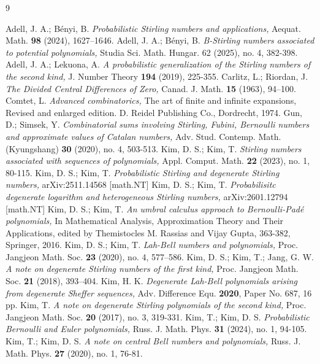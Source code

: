 \documentclass[a4paper,11pt]{amsart}
\begin{document}
\begin{thebibliography}{9} 

Adell, J. A.; B{\'e}nyi, B. \emph{Probabilistic Stirling numbers and applications,} Aequat. Math. \textbf{98} (2024), 1627–1646.
Adell, J. A.; B{\'e}nyi, B. \emph{B-Stirling numbers associated to potential polynomials,} Studia Sci. Math. Hungar. 62 (2025), no. 4, 382-398.
Adell, J. A.; Lekuona, A. \emph{A probabilistic generalization of the Stirling numbers of the second kind,} J. Number Theory \textbf{194} (2019), 225-355.
Carlitz, L.; Riordan, J. \emph{The Divided Central Differences of Zero,} Canad.  J.  Math.  \textbf{15} (1963), 94–100.
Comtet, L. \emph{Advanced combinatorics,} The art of finite and infinite expansions, Revised and enlarged edition. D. Reidel Publishing Co., Dordrecht, 1974.
Gun, D.; Simsek, Y. \emph{Combinatorial sums involving Stirling, Fubini, Bernoulli numbers and approximate values of Catalan numbers,} Adv. Stud. Contemp. Math. (Kyungshang) \textbf{30} (2020), no. 4, 503-513.
Kim, D. S.; Kim, T. \emph{Stirling numbers associated with sequences of polynomials,} Appl. Comput. Math. \textbf{22} (2023), no. 1, 80-115.
Kim, D. S.; Kim, T. \emph{Probabilistic Stirling and degenerate Stirling numbers,} arXiv:2511.14568 [math.NT]
Kim, D. S.; Kim, T. \emph{Probabilisitc degenerate logarithm and heterogeneous Stirling numbers,} arXiv:2601.12794 [math.NT]
Kim, D. S.; Kim, T. \emph{An umbral calculus approach to Bernoulli-Pad\'e polynomials,} In Mathematical Analysis, Approximation Theory and Their Applications, edited by Themistocles M. Rassias and Vijay Gupta, 363-382, Springer, 2016.
Kim, D. S.; Kim, T. \emph{Lah-Bell numbers and polynomials,} Proc.  Jangjeon Math.  Soc.  \textbf{23} (2020),  no. 4,  577–586. 
Kim, D. S.; Kim, T.; Jang, G. W. \emph{A note on degenerate Stirling numbers of the first kind,} Proc. Jangjeon Math. Soc. \textbf{21} (2018), 393–404.
Kim, H. K. \emph{Degenerate Lah-Bell polynomials arising from degenerate Sheffer sequences,} Adv.  Difference Equ.  \textbf{2020}, Paper No. 687, 16 pp.
Kim, T. \emph{A note on degenerate Stirling polynomials of the second kind,} Proc. Jangjeon Math. Soc. \textbf{20}  (2017),  no. 3, 319-331.
Kim, T.; Kim, D. S. \emph{Probabilistic Bernoulli and Euler polynomials,} Russ. J. Math. Phys. \textbf{31} (2024), no. 1, 94-105.
Kim, T.; Kim, D. S. \emph{A note on central Bell numbers and polynomials,} Russ.  J.  Math.  Phys. \textbf{27} (2020), no. 1, 76-81.

\end{thebibliography}
\end{document}
